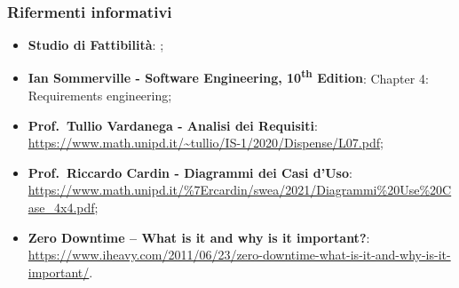     \subsubsection{Rifermenti informativi}
    \begin{itemize}
        \item \textbf{Studio di Fattibilità}: ;
        \item \textbf{Ian Sommerville - Software Engineering, 10\textsuperscript{th} Edition}: Chapter 4: Requirements engineering;
        \item \textbf{Prof.\ Tullio Vardanega - Analisi dei Requisiti}: \url{https://www.math.unipd.it/~tullio/IS-1/2020/Dispense/L07.pdf};
        \item \textbf{Prof.\ Riccardo Cardin - Diagrammi dei Casi d'Uso}: \url{https://www.math.unipd.it/\%7Ercardin/swea/2021/Diagrammi\%20Use\%20Case\_4x4.pdf};
        \item \textbf{Zero Downtime – What is it and why is it important?}: \url{https://www.iheavy.com/2011/06/23/zero-downtime-what-is-it-and-why-is-it-important/}.
    \end{itemize}
